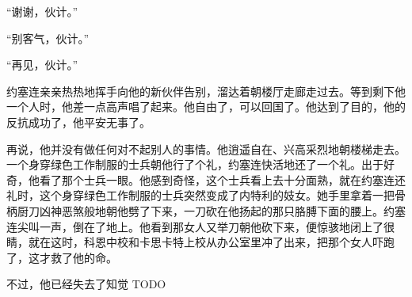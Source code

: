     “谢谢，伙计。”

    “别客气，伙计。”

    “再见，伙计。”

    约塞连亲亲热热地挥手向他的新伙伴告别，溜达着朝楼厅走廊走过去。等到剩下他一个人时，他差一点高声唱了起来。他自由了，可以回国了。他达到了目的，他的反抗成功了，他平安无事了。

    再说，他并没有做任何对不起别人的事情。他逍遥自在、兴高采烈地朝楼梯走去。一个身穿绿色工作制服的士兵朝他行了个礼，约塞连快活地还了一个礼。出于好奇，他看了那个士兵一眼。他感到奇怪，这个士兵看上去十分面熟，就在约塞连还礼时，这个身穿绿色工作制服的士兵突然变成了内特利的妓女。她手里拿着一把骨柄厨刀凶神恶煞般地朝他劈了下来，一刀砍在他扬起的那只胳膊下面的腰上。约塞连尖叫一声，倒在了地上。他看到那女人又举刀朝他砍下来，便惊骇地闭上了很睛，就在这时，科恩中校和卡思卡特上校从办公室里冲了出来，把那个女人吓跑了，这才救了他的命。

    不过，他已经失去了知觉
TODO
